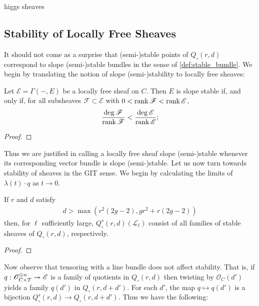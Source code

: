 \documentclass[12pt]{ociamthesis}  %
\begin{document}
\begin{example}
  higgs sheaves \missingexample
\end{example}

\subsection{Stability of Locally Free Sheaves}

It should not come as a surprise that (semi-)stable points of
$Q_\circ(r,d)$ correspond to slope (semi-)stable bundles
in the sense of \ref{def:stable_bundle}.
We begin by translating the notion of slope (semi-)stability to
locally free sheaves:

\begin{lemma}
  Let $\mathscr E=\Gamma(-,E)$ be a locally free sheaf on $C$.
  Then $E$ is slope stable if, and only if, for all subsheaves
  $\mathscr F\subset\mathscr E$ with $0<\operatorname{rank}\mathscr F<\operatorname{rank}\mathscr E$,
  \begin{align}\label{eq:sheaf_slope_stability}
    \frac{\deg\mathscr F}{\operatorname{rank}\mathscr F}<\frac{\deg\mathscr E}{\operatorname{rank}\mathscr E};
  \end{align}
  \begin{proof}
    \missingproof
  \end{proof}
\end{lemma}

Thus we are justified in calling a locally free sheaf slope (semi-)stable
whenever its corresponding vector bundle is slope (semi-)stable. Let us now turn
towards stability of sheaves in the GIT sense. We begin by
calculating the limits of $\lambda(t)\cdot q$ as $t\to 0$.


\begin{theorem}
  If $r$ and $d$ satisfy
  \begin{align*}
    d > \max(r^2(2g-2), gr^2 + r(2g-2))
  \end{align*}
  then, for $\ell$ sufficiently large, $Q^s_\circ(r,d)(\mathscr L_\ell)$
  consist of all families of stable sheaves of $Q_\circ(r,d)$, respectively.
  \begin{proof}
    \missingproof
  \end{proof}
\end{theorem}

Now observe that tensoring with a line bundle does not affect
stability. That is, if $q:\mathscr O^{\oplus n}_{C\times T} \twoheadrightarrow \mathscr E$
is a family of quotients in $Q_\circ(r,d)$ then twisting by
$\mathscr O_C(d')$ yields a family $q(d')$ in $Q_\circ(r,d+d')$.
For each $d'$, the map $q \mapsto q(d')$ is a bijection
$Q^s_\circ(r,d)\to Q_\circ(r,d+d')$. Thus we have the following:
\end{document}
